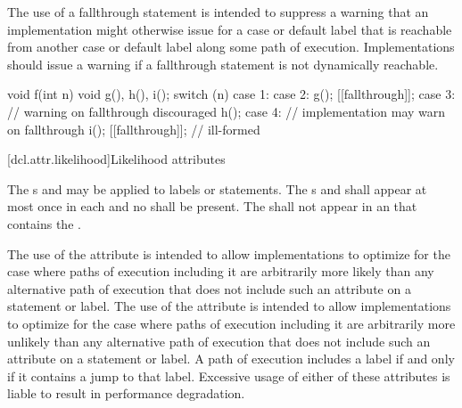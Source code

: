 \pnum
\begin{note}
The use of a fallthrough statement is intended to suppress
a warning that an implementation might otherwise issue
for a case or default label that is reachable
from another case or default label along some path of execution.
Implementations should issue a warning
if a fallthrough statement is not dynamically reachable.
\end{note}

\pnum
\begin{example}
\begin{codeblock}
void f(int n) {
  void g(), h(), i();
  switch (n) {
  case 1:
  case 2:
    g();
    [[fallthrough]];
  case 3:                       // warning on fallthrough discouraged
    h();
  case 4:                       // implementation may warn on fallthrough
    i();
    [[fallthrough]];            // ill-formed
  }
}
\end{codeblock}
\end{example}

[dcl.attr.likelihood]{Likelihood attributes}%

\pnum
The s
 and 
may be applied to labels or statements.
The s
 and 
shall appear at most once in each 
and no  shall be present.
The  
shall not appear in an 
that contains the  .

\pnum
\begin{note}
The use of the  attribute
is intended to allow implementations to optimize for
the case where paths of execution including it
are arbitrarily more likely
than any alternative path of execution
that does not include such an attribute on a statement or label.
The use of the  attribute
is intended to allow implementations to optimize for
the case where paths of execution including it
are arbitrarily more unlikely
than any alternative path of execution
that does not include such an attribute on a statement or label.
A path of execution includes a label
if and only if it contains a jump to that label.
Excessive usage of either of these attributes
is liable to result in performance degradation.
\end{note}

